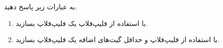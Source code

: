 
به عبارات زیر پاسخ دهید.

\begin{enumerate}
	\item 
	با استفاده از فلیپ‌فلاپ  یک فلیپ‌فلاپ  بسازید.
	
	\item 
	با استفاده از فلیپ‌فلاپ  و حداقل گیت‌های اضافه یک فلیپ‌فلاپ  بسازید.
\end{enumerate}